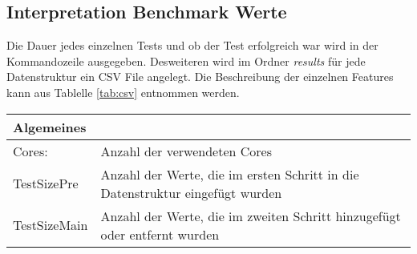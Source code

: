 \subsection{Interpretation Benchmark Werte}
Die Dauer jedes einzelnen Tests und ob der Test erfolgreich war wird in der Kommandozeile ausgegeben. Desweiteren wird
im Ordner \textit{results} für jede Datenstruktur ein CSV File angelegt. Die Beschreibung der einzelnen 
Features kann aus Tablelle \ref{tab:csv} entnommen werden.
\begin{table}[H]

	\begin{tabular}{ |m{2.5cm}|  m{13cm}| } 

		\hline
	\multicolumn{2}{|l|}{\textbf{Algemeines}}  \\  \hline
	 Cores: & 		Anzahl der verwendeten Cores    \\ \hline
	 TestSizePre& 	Anzahl der Werte, die im ersten Schritt in die Datenstruktur eingefügt wurden\\ \hline
	 TestSizeMain& 	Anzahl der Werte, die im zweiten Schritt hinzugefügt oder entfernt wurden\\ \hline
	 

\end{tabular}
\end{table}
